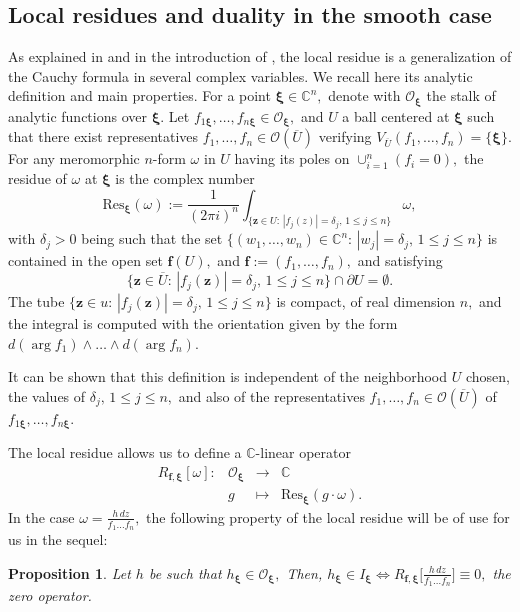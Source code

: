 \documentclass[a4paper,11pt]{amsart}
\newcommand{\C}{\mathbb{C}}
\newcommand{\cO}{{\mathcal O}}
\newcommand{\bff}{{\boldsymbol{f}}}
\newcommand{\bfz}{{\boldsymbol{z}}}
\newcommand{\bfxi}{{\boldsymbol{\xi}}}
\newcounter{thm}
\numberwithin{thm}{section}
\numberwithin{equation}{section}
\theoremstyle{definition}
\theoremstyle{plain}
\newtheorem{proposition}[thm]{Proposition}
\begin{document}
\subsection{Local residues and duality in the smooth case}\label{lrd}
As explained in \cite{DS91} and in the introduction of \cite{CDS94}, the local residue is a generalization of the Cauchy formula in several complex variables. We recall here its analytic definition and main properties.
For a point $\bfxi\in\C^n,$ denote with $\cO_\bfxi$ the stalk of analytic functions over $\bfxi.$ Let $f_{1\bfxi},\ldots, f_{n\bfxi}\in\cO_\bfxi,$ and $U$ a ball centered at $\bfxi$ such that there exist representatives $f_1,\ldots, f_n\in\cO(\overline{U})$ verifying $V_{\overline{U}}(f_1,\ldots,f_n)=\{\bfxi\}.$ For any meromorphic $n$-form $\omega$ in $U$ having its poles on $\cup_{i=1}^n (f_i=0),$ the residue of $\omega$ at $\bfxi$ is the complex number 
\begin{equation}\label{reslocal}
\mbox{Res}_\bfxi(\omega):=\frac{1}{(2\pi i)^n}\int_{\{\bfz\in U:\,|f_j(z)|=\delta_j,\,1\leq j\leq n\}}\omega,
\end{equation}
with $\delta_j>0$ being such that the set $\{(w_1,\ldots, w_n)\in\C^n:\,|w_j|=\delta_j,\, 1\leq j\leq n\}$ is contained in the open set $\bff(U),$ and $\bff:=(f_1,\ldots, f_n),$ and satisfying $$\{\bfz\in\overline{U}:\,|f_j(\bfz)|=\delta_j,\, 1\leq j\leq n\}\cap\partial U=\emptyset.$$ The tube $\{\bfz\in u:\,|f_j(\bfz)|=\delta_j,\,1\leq j\leq n\}$ is compact, of real dimension $n,$ and  the integral is computed with the orientation given by the form $d(\arg f_1)\wedge\ldots\wedge d(\arg f_n).$

It can be shown that this definition is independent of the neighborhood $U$ chosen, the values of $\delta_j,\,1\leq j\leq n,$ and also of the representatives $f_1,\ldots, f_n\in\cO(\overline{U})$ of $f_{1\bfxi},\ldots, f_{n\bfxi}.$

The local residue allows us to define a $\C$-linear operator 
\begin{equation}\label{resop}
\begin{array}{cccc}
R_{\bff, \bfxi}[\omega]:& \cO_\bfxi& \to& \C\\
  &  g& \mapsto & \mbox{Res}_\bfxi(g\cdot\omega).
\end{array}
\end{equation}
In the case $\omega=\frac{h\,dz}{f_1\ldots f_n},$  the following property of the local residue will be of use for us in the sequel:
\begin{proposition}\label{lresid}
Let $h$ be such that $h_\bfxi\in\cO_\bfxi,$ Then,
 $h_\bfxi\in I_\bfxi\iff R_{\bff, \bfxi}\big[\frac{h\,dz}{f_1\ldots f_n}\big]\equiv0,$ the zero operator. 
\end{proposition}
\end{document}
